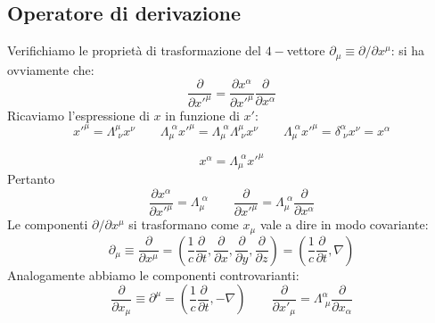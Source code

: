 \subsection{Operatore di derivazione}
Verifichiamo le proprietà di trasformazione del $4-$vettore $\partial_\mu\equiv\partial/\partial x^{\mu}$:
si ha ovviamente che:
\begin{equation*}   
    \frac{\partial}{\partial x'^\mu} = \frac{\partial x^\alpha}{\partial x'^\mu} \frac{\partial}{\partial x^\alpha}
\end{equation*}
Ricaviamo l'espressione di $x$ in funzione di $x'$:
\begin{equation*}
    x'^\mu = \Lambda^\mu_{\,\,\nu} x^\nu \qquad \Lambda_\mu^{\,\,\alpha} x'^\mu = \Lambda_\mu^{\,\,\alpha} \Lambda^\mu_{\,\,\nu} x^\nu \qquad \Lambda_\mu^{\,\,\alpha} x'^\mu = \delta^\alpha_{\,\,\nu} x^\nu = x^\alpha
\end{equation*}

\begin{equation*}
    x^\alpha = \Lambda_\mu^{\,\,\alpha} x'^\mu
\end{equation*}
Pertanto
\begin{equation*}
    \frac{\partial x^\alpha}{\partial x'^\mu} = \Lambda_\mu^{\,\,\alpha} \qquad \displaystyle \frac{\partial}{\partial x'^\mu} = \Lambda_\mu^{\,\,\alpha} \frac{\partial}{\partial x^\alpha}
\end{equation*}
Le componenti $\partial/\partial x^\mu$ si trasformano come $x_\mu$ vale a dire in modo covariante:
\begin{equation*}
    \partial_\mu \equiv \frac{\partial}{\partial x^\mu} = \left(\frac{1}{c}\frac{\partial}{\partial t}, \frac{\partial}{\partial x}, \frac{\partial}{\partial y}, \frac{\partial}{\partial z}\right) = \left(\frac{1}{c}\frac{\partial}{\partial t}, \nabla\right)
\end{equation*}
Analogamente abbiamo le componenti controvarianti:
\begin{equation*}
    \frac{\partial}{\partial x_\mu} \equiv \partial^\mu = \left(\frac{1}{c}\frac{\partial}{\partial t}, -\nabla\right) \qquad \displaystyle \frac{\partial}{\partial x'_\mu} = \Lambda^\alpha_{\,\,\mu} \frac{\partial}{\partial x_\alpha}
\end{equation*}
